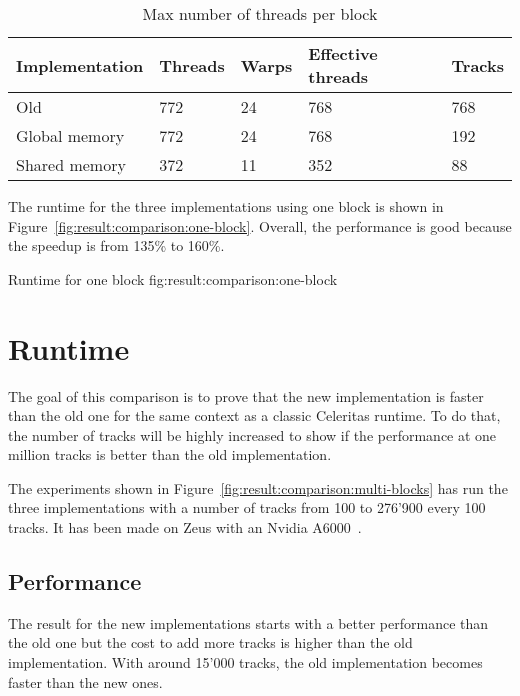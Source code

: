 \begin{table}[ht]
    \centering
    \begin{tabular}{|l|l|l|l|l|}
        \hline
        \textbf{Implementation} & \textbf{Threads} & \textbf{Warps} & \textbf{Effective threads} & \textbf{Tracks} \\
        \hline
        Old & 772 & 24 & 768 & 768 \\
        \hline
        Global memory & 772 & 24 & 768 & 192 \\
        \hline
        Shared memory & 372 & 11 & 352 & 88 \\
        \hline
    \end{tabular}
    \caption{Max number of threads per block}
    \label{tab:result:comparison:block}
\end{table}

The runtime for the three implementations using one block is shown in
Figure~\ref{fig:result:comparison:one-block}.
Overall, the performance is good because the speedup is from 135\% to 160\%.

{Runtime for one block}
{fig:result:comparison:one-block}

\section{Runtime}
\label{ch:result:comparison:runtime}

The goal of this comparison is to prove that the new implementation
is faster than the old one for the same context as a classic Celeritas runtime.
To do that, the number of tracks will be highly increased to show if the
performance at one million tracks is better than the old implementation.

The experiments shown in Figure~\ref{fig:result:comparison:multi-blocks} has run the
three implementations with a number of tracks from 100 to 276'900 every 100
tracks.
It has been made on Zeus with an Nvidia A6000~\cite{nvidia-a6000}.

\subsection{Performance}
\label{ch:result:comparison:performance}

The result for the new implementations starts with a better performance than the
old one but the cost to add more tracks is higher than the old implementation.
With around 15'000 tracks, the old implementation becomes faster than the new ones.

